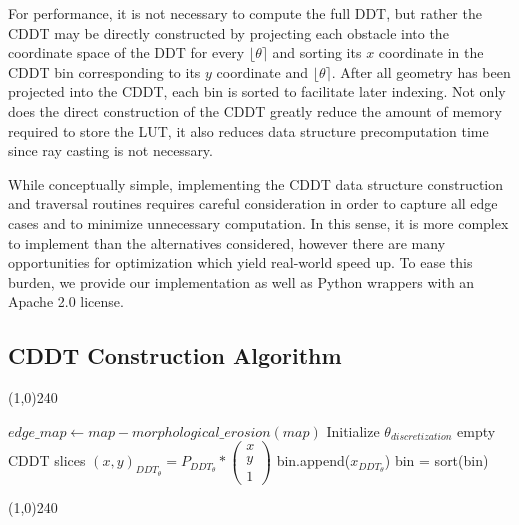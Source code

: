 \documentclass[letterpaper, 10 pt, conference]{ieeeconf}  %
\begin{document}
For performance, it is not necessary to compute the full DDT, but rather the CDDT may be directly constructed by projecting each obstacle into the coordinate space of the DDT for every $\lfloor\theta\rceil$ and sorting its $x$ coordinate in the CDDT bin corresponding to its $y$ coordinate and $\lfloor\theta\rceil$. After all geometry has been projected into the CDDT, each bin is sorted to facilitate later indexing. Not only does the direct construction of the CDDT greatly reduce the amount of memory required to store the LUT, it also reduces data structure precomputation time since ray casting is not necessary.

While conceptually simple, implementing the CDDT data structure construction and traversal routines requires careful consideration in order to capture all edge cases and to minimize unnecessary computation. In this sense, it is more complex to implement than the alternatives considered, however there are many opportunities for optimization which yield real-world speed up. To ease this burden, we provide our implementation as well as Python wrappers with an Apache 2.0 license.

\subsection{CDDT Construction Algorithm}

\begin{center}
\line(1,0){240}
\end{center}
\begin{algorithmic}
\STATE $edge\_map\gets map-morphological\_erosion(map)$
\STATE Initialize $\theta_{discretization}$ empty CDDT slices
\FOR {$\theta \in \{\lfloor\theta\rceil\}$} 
            \STATE $(x,y)_{DDT_{\theta}} = P_{DDT_{\theta}}*\begin{pmatrix}
                        x \\
                        y \\
                        1
             \end{pmatrix}$
                \STATE bin.append($x_{DDT_{\theta}}$)
             \ENDFOR
        \ENDFOR
            \STATE bin = sort(bin)
        \ENDFOR
\ENDFOR
\end{algorithmic}
\begin{center}
\line(1,0){240}
\end{center}
\end{document}
